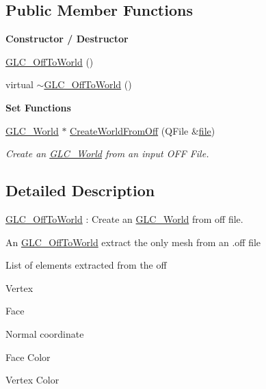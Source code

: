 \subsection*{Public Member Functions}
\begin{Indent}{\bf Constructor / Destructor}\par
\begin{DoxyCompactItemize}
\item 
\hyperlink{class_g_l_c___off_to_world_a2126eeda550ce084a8dfc856018023b0}{G\-L\-C\-\_\-\-Off\-To\-World} ()
\item 
virtual \hyperlink{class_g_l_c___off_to_world_a177d0d319cb9fdf2e97d68f1e8c06292}{$\sim$\-G\-L\-C\-\_\-\-Off\-To\-World} ()
\end{DoxyCompactItemize}
\end{Indent}
\begin{Indent}{\bf Set Functions}\par
\begin{DoxyCompactItemize}
\item 
\hyperlink{class_g_l_c___world}{G\-L\-C\-\_\-\-World} $\ast$ \hyperlink{class_g_l_c___off_to_world_ae2a29fe78448c6da73a19812bdd310e1}{Create\-World\-From\-Off} (Q\-File \&\hyperlink{uavobjecttemplate_8m_a97c04efa65bcf0928abf9260bc5cbf46}{file})
\begin{DoxyCompactList}\small\item\em Create an \hyperlink{class_g_l_c___world}{G\-L\-C\-\_\-\-World} from an input O\-F\-F File. \end{DoxyCompactList}\end{DoxyCompactItemize}
\end{Indent}


\subsection{Detailed Description}
\hyperlink{class_g_l_c___off_to_world}{G\-L\-C\-\_\-\-Off\-To\-World} \-: Create an \hyperlink{class_g_l_c___world}{G\-L\-C\-\_\-\-World} from off file. 

An \hyperlink{class_g_l_c___off_to_world}{G\-L\-C\-\_\-\-Off\-To\-World} extract the only mesh from an .off file \par
 List of elements extracted from the off
\begin{DoxyItemize}
\item Vertex
\item Face
\item Normal coordinate
\item Face Color
\item Vertex Color 
\end{DoxyItemize}

